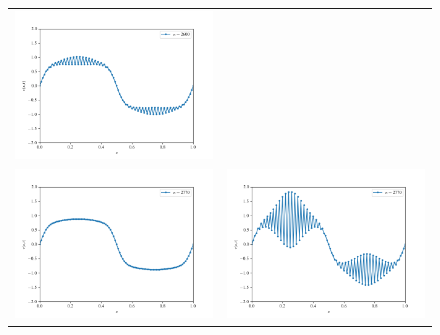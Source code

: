 \documentclass[12pt, reqno]{report}
\theoremstyle{definition}
\theoremstyle{remark}
\begin{document}
\begin{figure}[H]
\begin{tabular}{cc}
        \includegraphics[width = \acfdwidth]{media_paper/unstable_CH_FD_2600} \\
        \includegraphics[width = \acfdwidth]{media_paper/stable_CH_FD_2770} & 
        \includegraphics[width = \acfdwidth]{media_paper/unstable_CH_FD_2770} \\

\end{tabular}
\end{figure}
\end{document}
